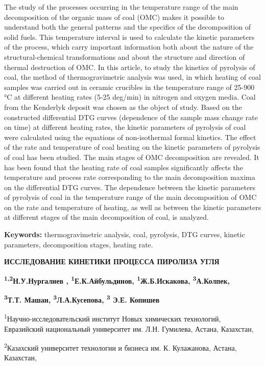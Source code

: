The study of the processes occurring in the temperature range of the
main decomposition of the organic mass of coal (OMC) makes it possible
to understand both the general patterns and the specifics of the
decomposition of solid fuels. This temperature interval is used to
calculate the kinetic parameters of the process, which carry important
information both about the nature of the structural-chemical
transformations and about the structure and direction of thermal
destruction of OMC. In this article, to study the kinetics of pyrolysis
of coal, the method of thermogravimetric analysis was used, in which
heating of coal samples was carried out in ceramic crucibles in the
temperature range of 25-900 °C at different heating rates (5-25 deg/min)
in nitrogen and oxygen media. Coal from the Kenderlyk deposit was chosen
as the object of study. Based on the constructed differential DTG curves
(dependence of the sample mass change rate on time) at different heating
rates, the kinetic parameters of pyrolysis of coal were calculated using
the equations of non-isothermal formal kinetics. The effect of the rate
and temperature of coal heating on the kinetic parameters of pyrolysis
of coal has been studied. The main stages of OMC decomposition are
revealed. It has been found that the heating rate of coal samples
significantly affects the temperature and process rate corresponding to
the main decomposition maxima on the differential DTG curves. The
dependence between the kinetic parameters of pyrolysis of coal in the
temperature range of the main decomposition of OMC on the rate and
temperature of heating, as well as between the kinetic parameters at
different stages of the main decomposition of coal, is analyzed.

\textbf{Keywords:} thermogravimetric analysis, coal, pyrolysis, DTG
curves, kinetic parameters, decomposition stages, heating rate.

\textbf{ИССЛЕДОВАНИЕ КИНЕТИКИ ПРОЦЕССА ПИРОЛИЗА УГЛЯ}

\textbf{\textsuperscript{1,2}Н.У.Нургалиев ,
\textsuperscript{1}Е.К.Айбульдинов, \textsuperscript{1}Ж.Б.Искакова,
\textsuperscript{3}А.Колпек,}

\textbf{\textsuperscript{3}Т.Т. Машан, \textsuperscript{3}Л.А.Кусепова,
\textsuperscript{3} Э.Е. Копишев}

\textsuperscript{1}Научно-исследовательский институт Новых химических
технологий, Евразийский национальный университет им. Л.Н. Гумилева,
Астана, Казахстан,

\textsuperscript{2}Казахский университет технологии и бизнеса им. К.
Кулажанова, Астана, Казахстан,

